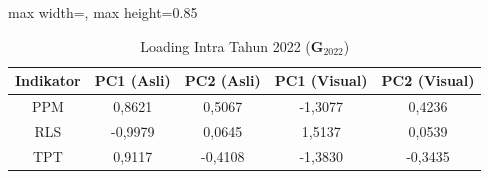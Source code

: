 \begin{table}[H]
\centering
\caption{Loading Intra Tahun 2022 ($\mathbf{G}_{2022}$)} \label{tab:sample1loading_intra_2022}
\begin{adjustbox}{max width=\textwidth, max height=0.85\textheight}
\begin{tabular}{|c|c|c|c|c|}
\hline
\textbf{Indikator} & \textbf{PC1 (Asli)} & \textbf{PC2 (Asli)} & \textbf{PC1 (Visual)} & \textbf{PC2 (Visual)} \\
\hline
PPM & 0,8621 & 0,5067 & -1,3077 & 0,4236 \\
RLS & -0,9979 & 0,0645 & 1,5137 & 0,0539 \\
TPT & 0,9117 & -0,4108 & -1,3830 & -0,3435 \\
\hline
\end{tabular}
\end{adjustbox}
\end{table}